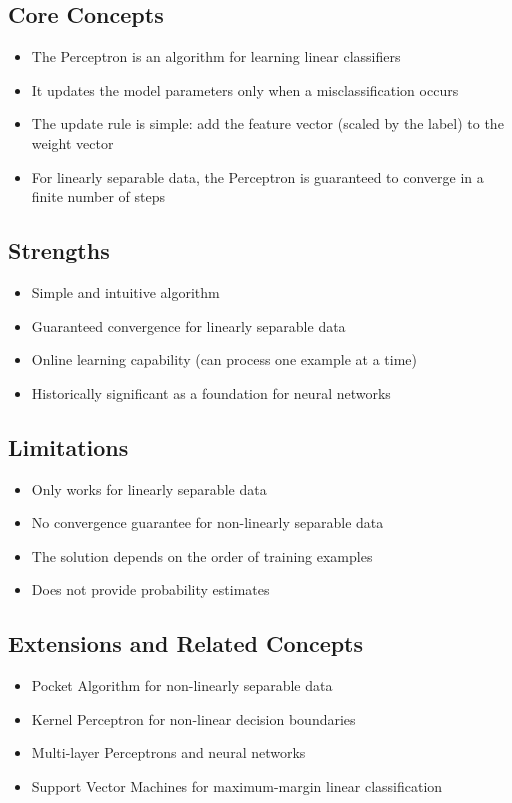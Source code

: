 \documentclass{article}
\begin{document}
\subsection{Core Concepts}
\begin{itemize}
    \item The Perceptron is an algorithm for learning linear classifiers
    \item It updates the model parameters only when a misclassification occurs
    \item The update rule is simple: add the feature vector (scaled by the label) to the weight vector
    \item For linearly separable data, the Perceptron is guaranteed to converge in a finite number of steps
\end{itemize}

\subsection{Strengths}
\begin{itemize}
    \item Simple and intuitive algorithm
    \item Guaranteed convergence for linearly separable data
    \item Online learning capability (can process one example at a time)
    \item Historically significant as a foundation for neural networks
\end{itemize}

\subsection{Limitations}
\begin{itemize}
    \item Only works for linearly separable data
    \item No convergence guarantee for non-linearly separable data
    \item The solution depends on the order of training examples
    \item Does not provide probability estimates
\end{itemize}

\subsection{Extensions and Related Concepts}
\begin{itemize}
    \item Pocket Algorithm for non-linearly separable data
    \item Kernel Perceptron for non-linear decision boundaries
    \item Multi-layer Perceptrons and neural networks
    \item Support Vector Machines for maximum-margin linear classification
\end{itemize}
\end{document}
